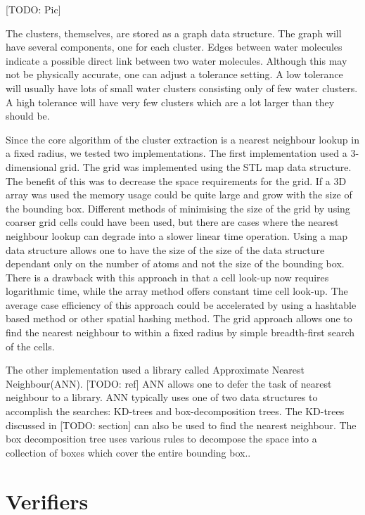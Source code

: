 \documentclass[a4paper,11pt]{report}
\begin{document}
[TODO: Pic]

The clusters, themselves, are stored as a graph data structure. The graph will have several components, one for each cluster. Edges between water molecules indicate a possible direct link between two water molecules. Although this may not be physically accurate, one can adjust a tolerance setting. A low tolerance will usually have lots of small water clusters consisting only of few water clusters. A high tolerance will have very few clusters which are a lot larger than they should be.

Since the core algorithm of the cluster extraction is a nearest neighbour lookup in a fixed radius, we tested two implementations. The first implementation used a 3-dimensional grid. The grid was implemented using the STL map data structure. The benefit of this was to decrease the space requirements for the grid. If a 3D array was used the memory usage could be quite large and grow with the size of the bounding box. Different methods of minimising the size of the grid by using coarser grid cells could have been used, but there are cases where the nearest neighbour lookup can degrade into a slower linear time operation. Using a map data structure allows one to have the size of the size of the data structure dependant only on the number of atoms and not the size of the bounding box. There is a drawback with this approach in that a cell look-up now requires logarithmic time, while the array method offers constant time cell look-up. The average case efficiency of this approach could be accelerated by using a hashtable based method or other spatial hashing method. The grid approach allows one to find the nearest neighbour to within a fixed radius by simple breadth-first search of the cells.

The other implementation used a library called Approximate Nearest Neighbour(ANN). [TODO: ref] ANN allows one to defer the task of nearest neighbour to a library. ANN typically uses one of two data structures to accomplish the searches: KD-trees and box-decomposition trees. The KD-trees discussed in [TODO: section] can also be used to find the nearest neighbour. The box decomposition tree uses various rules to decompose the space into a collection of boxes which cover the entire bounding box..



\section{Verifiers}
\end{document}

